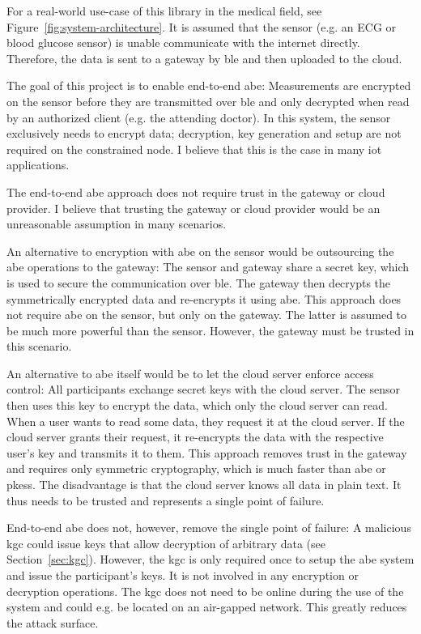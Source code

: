 

For a real-world use-case of this library in the medical field, see Figure~\ref{fig:system-architecture}.
It is assumed that the sensor (e.g. an ECG or blood glucose sensor) is unable communicate with the internet directly.
Therefore, the data is sent to a gateway by \acrfull{ble} and then uploaded to the cloud.

The goal of this project is to enable end-to-end \acrlong{abe}:
Measurements are encrypted on the sensor before they are transmitted over \acrshort{ble} and only decrypted when read by an authorized client (e.g. the attending doctor).
In this system, the sensor exclusively needs to encrypt data; decryption, key generation and setup are not required on the constrained node.
I believe that this is the case in many \acrshort{iot} applications.

The end-to-end \acrshort{abe} approach does not require trust in the gateway or cloud provider.
I believe that trusting the gateway or cloud provider would be an unreasonable assumption in many scenarios.

An alternative to encryption with \acrshort{abe} on the sensor would be outsourcing the \acrshort{abe} operations to the gateway:
The sensor and gateway share a secret key, which is used to secure the communication over \acrshort{ble}.
The gateway then decrypts the symmetrically encrypted data and re-encrypts it using \acrshort{abe}.
This approach does not require \acrshort{abe} on the sensor, but only on the gateway.
The latter is assumed to be much more powerful than the sensor.
However, the gateway must be trusted in this scenario.

An alternative to \acrshort{abe} itself would be to let the cloud server enforce access control:
All participants exchange secret keys with the cloud server.
The sensor then uses this key to encrypt the data, which only the cloud server can read.
When a user wants to read some data, they request it at the cloud server.
If the cloud server grants their request, it re-encrypts the data with the respective user's key and transmits it to them.
This approach removes trust in the gateway and requires only symmetric cryptography, which is much faster than \acrshort{abe} or \glspl{pkes}.
The disadvantage is that the cloud server knows all data in plain text. It thus needs to be trusted and represents a single point of failure.

End-to-end \acrshort{abe} does not, however, remove the single point of failure:
A malicious \acrfull{kgc} could issue keys that allow decryption of arbitrary data (see Section~\ref{sec:kgc}).
However, the \acrfull{kgc} is only required once to setup the \acrshort{abe} system and issue the participant's keys.
It is not involved in any encryption or decryption operations.
The \acrshort{kgc} does not need to be online during the use of the system and could e.g. be located on an air-gapped network. 
This greatly reduces the attack surface.
~\\

